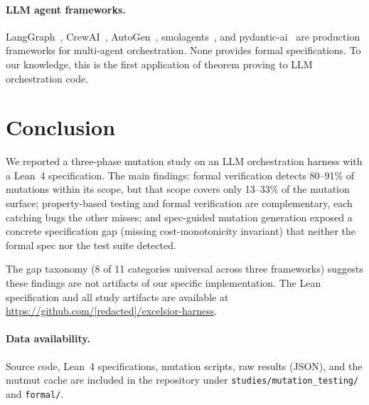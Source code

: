 \documentclass[11pt,a4paper]{article}
\begin{document}
\paragraph{LLM agent frameworks.}
LangGraph~\cite{langgraph2024}, CrewAI~\cite{crewai2024},
AutoGen~\cite{autogen2024}, smolagents~\cite{smolagents2024}, and
pydantic-ai~\cite{pydanticai2024} are production frameworks for
multi-agent orchestration. None provides formal specifications.
To our knowledge, this is the first application of theorem proving
to LLM orchestration code.

\section{Conclusion}
\label{sec:conclusion}

We reported a three-phase mutation study on an LLM orchestration
harness with a Lean~4 specification. The main findings:
formal verification detects 80--91\% of mutations within its
scope, but that scope covers only 13--33\% of the mutation surface;
property-based testing and formal verification are complementary,
each catching bugs the other misses; and spec-guided mutation
generation exposed a concrete specification gap (missing
cost-monotonicity invariant) that neither the formal spec nor the
test suite detected.

The gap taxonomy (8 of 11 categories universal across three
frameworks) suggests these findings are not artifacts of our
specific implementation. The Lean specification and all study
artifacts are available at
\url{https://github.com/[redacted]/excelsior-harness}.

\paragraph{Data availability.}
Source code, Lean~4 specifications, mutation scripts, raw results
(JSON), and the mutmut cache are included in the repository under
\texttt{studies/mutation\_testing/} and \texttt{formal/}.



\end{document}
